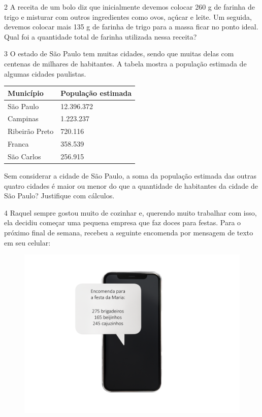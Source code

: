 \num{2} A receita de um bolo diz que inicialmente devemos colocar 260 g de
farinha de trigo e misturar com outros ingredientes como ovos, açúcar e
leite. Um seguida, devemos colocar mais 135 g de farinha de trigo para a
massa ficar no ponto ideal. Qual foi a quantidade total de farinha
utilizada nessa receita?




\num{3} O estado de São Paulo tem muitas cidades, sendo que muitas delas com
centenas de milhares de habitantes. A tabela mostra a população estimada
de algumas cidades paulistas.

\begin{longtable}[]{@{}ll@{}}
\toprule
Município & População estimada\tabularnewline
\midrule
\endhead
São Paulo & 12.396.372\tabularnewline
Campinas & 1.223.237\tabularnewline
Ribeirão Preto & 720.116\tabularnewline
Franca & 358.539\tabularnewline
São Carlos & 256.915\tabularnewline
\bottomrule
\end{longtable}


Sem considerar a cidade de São Paulo, a soma da população estimada das
outras quatro cidades é maior ou menor do que a quantidade de habitantes
da cidade de São Paulo? Justifique com cálculos.



\num{4} Raquel sempre gostou muito de cozinhar e,
querendo muito trabalhar com isso, ela decidiu começar uma pequena
empresa que faz doces para festas. Para o próximo final de semana, recebeu a seguinte encomenda por mensagem de texto em seu celular:

\begin{figure}[htpb!]
\includegraphics[width=\textwidth]{../ilustracoes/MAT5/SAEB_5ANO_MAT_figura18.png}
\end{figure}

